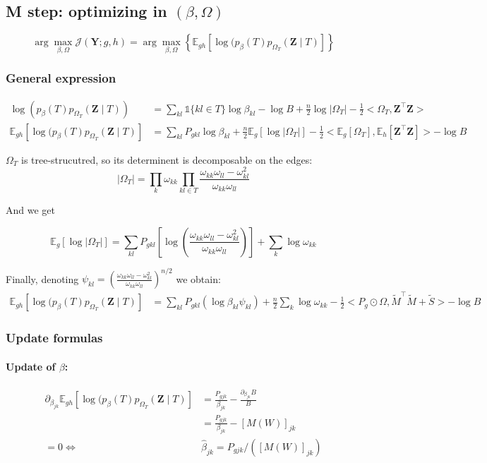 \documentclass[11pt,a4paper]{article}
\newcommand{\argmax}{\arg\!\max}
\newcommand{\Ybf}{\boldsymbol{Y}}
\newcommand{\Zbf}{\boldsymbol{Z}}
\newcommand{\Esp}{\mathds{E}}
\begin{document}
\subsection{M step: optimizing in $(\beta, \Omega)$}
 
$$ \argmax_{\beta, \Omega} \mathcal{J}(\Ybf ; g,h) =\argmax_{\beta, \Omega} \left\{ \Esp_{gh} [\log (p_\beta(T)p_{\Omega_T}(\Zbf\mid T) ]\right\} $$

\subsubsection{General expression}
\begin{align*}
\log (p_\beta(T)p_{\Omega_T}(\Zbf\mid T))  &= \sum_{kl} \mathds{1}\{kl \in T\} \log \beta_{kl} - \log B + \frac{n}{2}\log |\Omega_T| - \frac{1}{2}<\Omega_T,\Zbf^\intercal \Zbf>\\
\Esp_{gh} [\log (p_\beta(T)p_{\Omega_T}(\Zbf\mid T) ] &= \sum_{kl} P_{gkl} \log\beta_{kl} +\frac{n}{2} \Esp_g[\log |\Omega_T|] -\frac{1}{2} <\Esp_g [\Omega_T], \Esp_h[\Zbf^\intercal \Zbf]>- \log B
\end{align*}

$\Omega_T$ is tree-strucutred, so its determinent is decomposable on the edges:
$$|\Omega_{T}| = \prod_{k} \omega_{kk} \prod_{kl \in T} \frac{\omega_{kk}\omega_{ll}-\omega_{kl}^2}{\omega_{kk}\omega_{ll}}$$

And we get

$$\Esp_g[\log |\Omega_{T}|]= \sum _{kl} P_{gkl} \left[ \log\left(\frac{\omega_{kk}\omega_{ll}-\omega_{kl}^2}{\omega_{kk}\omega_{ll}}\right)\right] + \sum_k \log \omega_{kk}$$

Finally, denoting $\psi_{kl} = \left(\frac{\omega_{kk}\omega_{ll}-\omega_{kl}^2}{\omega_{kk}\omega_{ll}}\right)^{n/2}$ we obtain:
\begin{align*}
\Esp_{gh} [\log (p_\beta(T)p_{\Omega_T}(\Zbf\mid T) ] &=\sum_{kl} P_{gkl} \left(\log  \beta_{kl}\psi_{kl}\right) + \frac{n}{2}\sum_k \log \omega_{kk} - \frac{1}{2}<P_g \odot \Omega, \widetilde{M}^\intercal \widetilde{M} + \widetilde{S}>- \log B
\end{align*}
 
\subsubsection{Update formulas}
\paragraph{Update of $\beta$:}
\begin{align*}
\partial_{\beta_{jk}} \Esp_{gh} [\log (p_\beta(T)p_{\Omega_T}(\Zbf\mid T) ] &= \frac{P_{gjk}}{\beta_{jk}} - \frac{\partial_{\beta_{jk}} B }{B} \\
&=\frac{P_{gjk}}{\beta_{jk}}  - [M(W)]_{jk} \\
=0 \iff & \boxed{\widehat{\beta}_{jk} = P_{gjk} / ([M(W)]_{jk})}
\end{align*}\\
\end{document}
